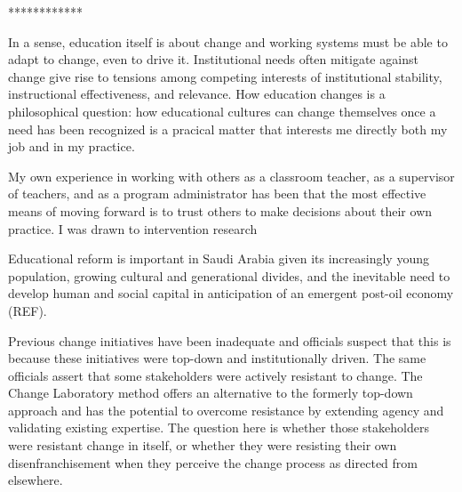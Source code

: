 \documentclass[a4paper,man,natbib]{apa6}
\begin{document}
************

In a sense, education itself is about change and working systems must be able to adapt to change, even to drive it. Institutional needs often mitigate against change give rise to tensions among competing interests of institutional stability, instructional effectiveness, and relevance. How education changes is a philosophical question: how educational cultures can change themselves once a need has been recognized is a pracical matter that interests me directly both my job and in my practice. 

My own experience in working with others as a classroom teacher, as a supervisor of teachers, and as a program administrator has been that the most effective means of moving forward is to trust others to make decisions about their own practice. I was drawn to intervention research 

Educational reform is important in Saudi Arabia given its increasingly young population, growing cultural and generational divides, and the inevitable need to develop human and social capital in anticipation of an emergent post-oil economy (REF). 


Previous change initiatives have been inadequate and  officials suspect that this is because these initiatives were top-down and institutionally driven. The same officials assert that some stakeholders were actively resistant to change. The Change Laboratory method offers an alternative to the formerly top-down approach and has the potential to overcome resistance by extending agency and validating existing expertise. The question here is whether those stakeholders were resistant change in itself, or whether they were resisting their own disenfranchisement when they perceive the change process as directed from elsewhere. 

\end{document}
